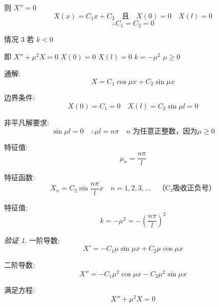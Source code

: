 \documentclass[12pt,a4paper]{article}
\numberwithin{subsection}{section}   %
\numberwithin{subsubsection}{subsection}
\theoremstyle{plain}
\theoremstyle{definition}
\theoremstyle{remark}
\theoremstyle{remark}
\newtheorem{verification}[theorem]{验证}
\begin{document}
则 \(X'' = 0\)
	\begin{equation}
		X(x) = C_1 x + C_2 \quad \text{且} \quad X(0) = 0 \quad X(l) = 0
	\end{equation}
	\begin{equation}
		\therefore C_1 = C_2 = 0
	\end{equation}
	
情况 3 \quad 若 \(k < 0\)

即 \(X'' + \mu^2 X = 0\) \quad \(X(0) = 0\) \quad \(X(l) = 0\) \quad \(k = -\mu^2\)  \quad \(\mu \geq 0\)
	
	通解:
	\begin{equation}
		X = C_1 \cos \mu x + C_2 \sin \mu x
	\end{equation}
	
	
	
	边界条件:
	\begin{equation}
		X(0) = C_1 = 0 \quad X(l) = C_2 \sin \mu l = 0
	\end{equation}
	
	非平凡解要求:
	\begin{equation*}
		\sin \mu l = 0 \quad \therefore \mu l = n\pi \quad n \text{ 为任意正整数，因为$\mu \geq 0$}
	\end{equation*}
	
	特征值:
	\begin{equation}
		\mu_n = \frac{n\pi}{l}
	\end{equation}
	
	特征函数:
	\begin{equation}
		X_n = C_2 \sin \frac{n\pi}{l} x \quad n = 1, 2, 3, \ldots \quad \text{（C₂吸收正负号）}
	\end{equation}
	
	特征值:
	\begin{equation}
		k = -\mu^2 = -\left(\frac{n\pi}{l}\right)^2
	\end{equation}
	
	\begin{verification}	
		一阶导数:
		\begin{equation*}
			X' = -C_1 \mu \sin \mu x + C_2 \mu \cos \mu x
		\end{equation*}
		
		二阶导数:
		\begin{equation*}
			X'' = -C_1 \mu^2 \cos \mu x - C_2 \mu^2 \sin \mu x
		\end{equation*}
		
		满足方程:
		\begin{equation*}
			X'' + \mu^2 X = 0
		\end{equation*}
	\end{verification}	
	
\end{document}
